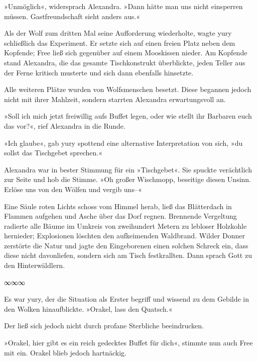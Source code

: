 »Unmöglich«, widersprach Alexandra. »Dann hätte man uns nicht einsperren müssen. Gastfreundschaft sieht anders aus.«

Als der Wolf zum dritten Mal seine Aufforderung wiederholte, wagte yury schließlich das Experiment. Er setzte sich auf einen freien Platz neben dem Kopfende; Free ließ sich gegenüber auf einem Mooskissen nieder. Am Kopfende stand Alexandra, die das gesamte Tischkonstrukt überblickte, jeden Teller aus der Ferne kritisch musterte und sich dann ebenfalls hinsetzte.

Alle weiteren Plätze wurden von Wolfsmenschen besetzt. Diese begannen jedoch nicht mit ihrer Mahlzeit, sondern starrten Alexandra erwartungsvoll an.

»Soll ich mich jetzt freiwillig aufs Buffet legen, oder wie stellt ihr Barbaren euch das vor?«, rief Alexandra in die Runde.

»Ich glaube«, gab yury spottend eine alternative Interpretation von sich, »du sollst das Tischgebet sprechen.«

Alexandra war in bester Stimmung für ein »Tischgebet«. Sie spuckte verächtlich zur Seite und hob die Stimme. »Oh großer Wischmopp, beseitige diesen Unsinn. Erlöse uns von den Wölfen und vergib uns–«

Eine Säule roten Lichts schoss vom Himmel herab, ließ das Blätterdach in Flammen aufgehen und Asche über das Dorf regnen. Brennende Vergeltung radierte alle Bäume im Umkreis von zweihundert Metern zu lebloser Holzkohle hernieder; Explosionen löschten den aufkeimenden Waldbrand. Wilder Donner zerstörte die Natur und jagte den Eingeborenen einen solchen Schreck ein, dass diese nicht davonliefen, sondern sich am Tisch festkrallten. Dann sprach Gott zu den Hinterwäldlern.


\begin{center}
∞∞∞
\end{center}

Es war yury, der die Situation als Erster begriff und wissend zu dem Gebilde in den Wolken hinaufblickte. »Orakel, lass den Quatsch.«

Der ließ sich jedoch nicht durch profane Sterbliche beeindrucken. 

»Orakel, hier gibt es ein reich gedecktes Buffet für dich«, stimmte nun auch Free mit ein. Orakel blieb jedoch hartnäckig.

